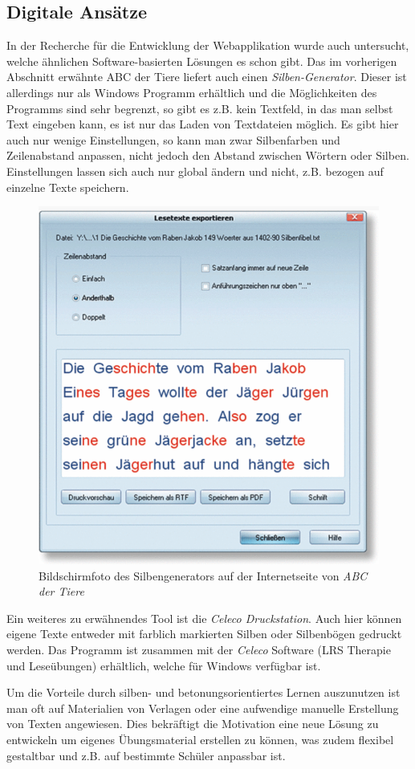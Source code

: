 \subsection{Digitale Ansätze}
\label{sec:lrs-digital}

In der Recherche für die Entwicklung der Webapplikation wurde auch untersucht, welche ähnlichen Software-basierten Lösungen es schon gibt. Das im vorherigen Abschnitt erwähnte ABC der Tiere liefert auch einen \textit{Silben-Generator}\cite{ABCSilbengenerator2018}. Dieser ist allerdings nur als Windows Programm erhältlich und die Möglichkeiten des Programms sind sehr begrenzt, so gibt es z.B. kein Textfeld, in das man selbst Text eingeben kann, es ist nur das Laden von Textdateien möglich. Es gibt hier auch nur wenige Einstellungen, so kann man zwar Silbenfarben und Zeilenabstand anpassen, nicht jedoch den Abstand zwischen Wörtern oder Silben. Einstellungen lassen sich auch nur global ändern und nicht, z.B. bezogen auf einzelne Texte speichern.\\
\begin{figure}[h!]
	\centering
	\includegraphics[width=.5\linewidth]{figures/ABCsilbengenerator}
	\caption{Bildschirmfoto des Silbengenerators auf der Internetseite von \textit{ABC der Tiere}\cite{ABCSilbengenerator2018}}
	\label{fig:ABCsilbengenerator}
\end{figure}
Ein weiteres zu erwähnendes Tool ist die \textit{Celeco Druckstation}\cite{celeco2018}. Auch hier können eigene Texte entweder mit farblich markierten Silben oder Silbenbögen gedruckt werden. Das Programm ist zusammen mit der \textit{Celeco} Software (LRS Therapie und Leseübungen) erhältlich, welche für Windows verfügbar ist.

Um die Vorteile durch silben- und betonungsorientiertes Lernen auszunutzen ist man oft auf Materialien von Verlagen oder eine aufwendige manuelle Erstellung von Texten angewiesen. Dies bekräftigt die Motivation eine neue Lösung zu entwickeln um eigenes Übungsmaterial erstellen zu können, was zudem flexibel gestaltbar und z.B. auf bestimmte Schüler anpassbar ist.

